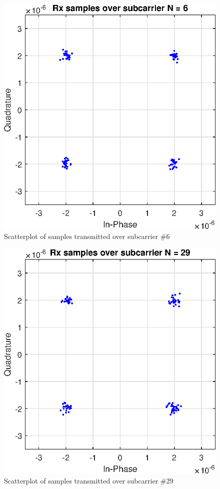 \documentclass[conference]{IEEEtran}
\begin{document}
\begin{appendices}
\begin{figure}[H]
    \centering
    \includegraphics[width=\linewidth]{images/AWGNN6.eps}
    \caption{Scatterplot of samples transmitted over subcarrier \#6}
    \label{AWGN6}
\end{figure}

\begin{figure}[H]
    \centering
    \includegraphics[width=\linewidth]{images/AWGNN29.eps}
    \caption{Scatterplot of samples transmitted over subcarrier \#29}
    \label{AWGN29}
\end{figure}


\end{appendices}
\end{document}
